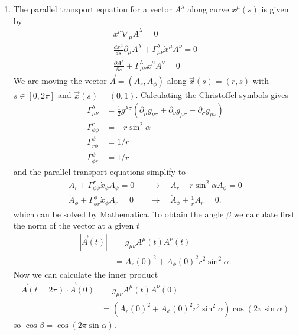 \documentclass[10pt,a4paper]{article}
\theoremstyle{definition}
\begin{document}
\begin{enumerate}
\item The parallel transport equation for a vector $A^\lambda$ along curve $x^\mu(s)$ is given by
\begin{align}
\dot x^\mu\nabla_\mu A^\lambda=0\\
\frac{dx^\mu}{ds}\partial_\mu A^\lambda+\Gamma^\lambda_{\mu\nu}\dot x^{\mu}A^\nu=0\\
\frac{\partial A^\lambda}{\partial s}+\Gamma^\lambda_{\mu\nu}\dot x^{\mu}A^\nu=0
\end{align}
We are moving the vector $\vec{A}=(A_r,A_\phi)$ along $\vec{x}(s)=(r,s)$ with $s\in[0,2\pi]$ and $\dot{\vec{x}}(s)=(0,1)$. Calculating the Christoffel symbols gives 
\begin{align}
\Gamma^\lambda_{\mu\nu}&=\frac{1}{2}g^{\lambda\sigma}(\partial_\mu g_{\nu\sigma}+\partial_\nu g_{\mu\sigma}-\partial_\sigma g_{\mu\nu})\\
\Gamma^r_{\phi\phi}&=-r\sin^2\alpha\\
\Gamma^\phi_{r\phi}&=1/r\\
\Gamma^\phi_{\phi r}&=1/r
\end{align}
and the parallel transport equations simplify to
\begin{align}
\dot{A}_r+\Gamma^r_{\phi\phi}\dot{x}_\phi A_\phi=0&\quad\rightarrow\quad \dot{A}_r-r\sin^2\alpha A_\phi=0\\
\dot{A}_\phi+\Gamma^\phi_{\phi r}\dot{x}_\phi A_r=0&\quad\rightarrow\quad \dot{A}_\phi+\frac{1}{r}A_r=0.
\end{align}
which can be solved by Mathematica. To obtain the angle $\beta$ we calculate first the norm of the vector at a given $t$
\begin{align}
	|\vec{A}(t)|&=g_{\mu\nu}A^\mu(t) A^\nu(t)\\
	&=A_r(0)^2+A_\phi(0)^2r^2\sin^2\alpha.
\end{align}
Now we can calculate the inner product
\begin{align}
	\vec{A}(t=2\pi)\cdot\vec{A}(0)&=g_{\mu\nu}A^\mu(t) A^\nu(0)\\
	&=(A_r(0)^2+A_\phi(0)^2r^2\sin^2\alpha)\cos(2\pi\sin\alpha)
\end{align}
so $\cos\beta=\cos(2\pi\sin\alpha)$.

\end{enumerate}
\end{document}

